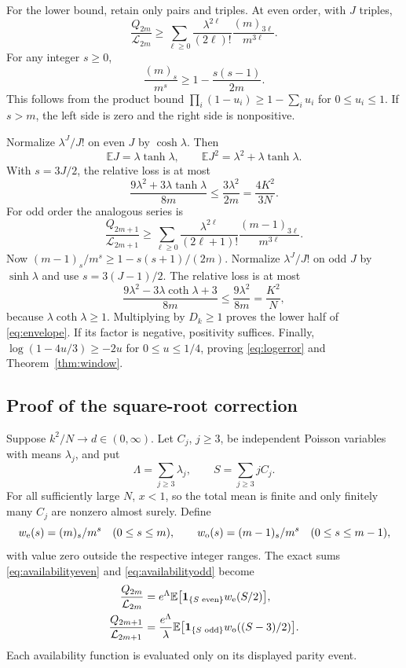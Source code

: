 \documentclass[11pt]{article}
\theoremstyle{definition}
\theoremstyle{remark}
\newcommand{\E}{\mathbb E}
\newcommand{\1}{\mathbf 1}
\begin{document}
For the lower bound, retain only pairs and triples. At even order, with $J$ triples,
\[
\frac{Q_{2m}}{\mathcal L_{2m}}
\ge\sum_{\ell\ge0}\frac{\lambda^{2\ell}}{(2\ell)!}
\frac{(m)_{3\ell}}{m^{3\ell}}.
\]
For any integer $s\ge0$,
\[
\frac{(m)_s}{m^s}\ge1-\frac{s(s-1)}{2m}.
\]
This follows from the product bound $\prod_i(1-u_i)\ge1-\sum_i u_i$ for $0\le u_i\le1$. If $s>m$, the left side is zero and the right side is nonpositive.

Normalize $\lambda^J/J!$ on even $J$ by $\cosh\lambda$. Then
\[
\E J=\lambda\tanh\lambda,\qquad
\E J^2=\lambda^2+\lambda\tanh\lambda.
\]
With $s=3J/2$, the relative loss is at most
\[
\frac{9\lambda^2+3\lambda\tanh\lambda}{8m}
\le\frac{3\lambda^2}{2m}=\frac{4K^2}{3N}.
\]
For odd order the analogous series is
\[
\frac{Q_{2m+1}}{\mathcal L_{2m+1}}
\ge\sum_{\ell\ge0}\frac{\lambda^{2\ell}}{(2\ell+1)!}
\frac{(m-1)_{3\ell}}{m^{3\ell}}.
\]
Now $(m-1)_s/m^s\ge1-s(s+1)/(2m)$. Normalize $\lambda^J/J!$ on odd $J$ by $\sinh\lambda$ and use $s=3(J-1)/2$. The relative loss is at most
\[
\frac{9\lambda^2-3\lambda\coth\lambda+3}{8m}
\le\frac{9\lambda^2}{8m}=\frac{K^2}N,
\]
because $\lambda\coth\lambda\ge1$. Multiplying by $D_k\ge1$ proves the lower half of \eqref{eq:envelope}. If its factor is negative, positivity suffices. Finally, $\log(1-4u/3)\ge-2u$ for $0\le u\le1/4$, proving \eqref{eq:logerror} and Theorem~\ref{thm:window}.

\subsection{Proof of the square-root correction}

Suppose $k^2/N\to d\in(0,\infty)$. Let $C_j$, $j\ge3$, be independent Poisson variables with means $\lambda_j$, and put
\[
\Lambda=\sum_{j\ge3}\lambda_j,\qquad S=\sum_{j\ge3}jC_j.
\]
For all sufficiently large $N$, $x<1$, so the total mean is finite and only finitely many $C_j$ are nonzero almost surely. Define
\[
w_{\rm e}(s)=(m)_s/m^s\quad(0\le s\le m),\qquad
w_{\rm o}(s)=(m-1)_s/m^s\quad(0\le s\le m-1),
\]
with value zero outside the respective integer ranges. The exact sums \eqref{eq:availabilityeven} and \eqref{eq:availabilityodd} become
\begin{align}
\frac{Q_{2m}}{\mathcal L_{2m}}
&=e^\Lambda\E\bigl[\1_{\{S\text{ even}\}}w_{\rm e}(S/2)\bigr],\label{eq:poissoneven}\\
\frac{Q_{2m+1}}{\mathcal L_{2m+1}}
&=\frac{e^\Lambda}{\lambda}\E\bigl[\1_{\{S\text{ odd}\}}w_{\rm o}((S-3)/2)\bigr].\label{eq:poissonodd}
\end{align}
Each availability function is evaluated only on its displayed parity event.
\end{document}
